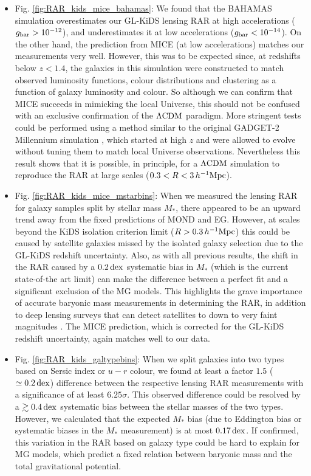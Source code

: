 \documentclass[usenatbib]{mnras}
\newcommand{\hMpc}{\, h^{-1}{\rm{Mpc}} }
\newcommand{\lcdm}{{\rm \Lambda CDM}}
\newcommand{\un}[1]{_{\rm #1}}
\newcommand{\dex}{\, {\rm dex}}
\begin{document}
\begin{itemize}
	\item Fig. \ref{fig:RAR_kids_mice_bahamas}: We found that the BAHAMAS simulation overestimates our GL-KiDS lensing RAR at high accelerations ($g\un{bar}>10^{-12}$), and underestimates it at low accelerations ($g\un{bar}<10^{-14}$). On the other hand, the prediction from MICE (at low accelerations) matches our measurements very well. However, this was to be expected since, at redshifts below $z<1.4$, the galaxies in this simulation were constructed to match observed luminosity functions, colour distributions and clustering as a function of galaxy luminosity and colour. So although we can confirm that MICE succeeds in mimicking the local Universe, this should not be confused with an exclusive confirmation of the $\lcdm$ paradigm. More stringent tests could be performed using a method similar to the original {\scshape GADGET-2} Millennium simulation \cite[]{springel2001,springel2005}, which started at high $z$ and were allowed to evolve without tuning them to match local Universe observations. Nevertheless this result shows that it is possible, in principle, for a $\lcdm$ simulation to reproduce the RAR at large scales ($0.3 < R < 3 \hMpc$).
	
	\item Fig. \ref{fig:RAR_kids_mice_mstarbins}: When we measured the lensing RAR for galaxy samples split by stellar mass $M_*$, there appeared to be an upward trend away from the fixed predictions of MOND and EG. However, at scales beyond the KiDS isolation criterion limit ($R>0.3 \hMpc$) this could be caused by satellite galaxies missed by the isolated galaxy selection due to the GL-KiDS redshift uncertainty. Also, as with all previous results, the shift in the RAR caused by a $0.2 \dex$ systematic bias in $M_*$ (which is the current state-of-the art limit) can make the difference between a perfect fit and a significant exclusion of the MG models. This highlights the grave importance of accurate baryonic mass measurements in determining the RAR, in addition to deep lensing surveys that can detect satellites to down to very faint magnitudes \cite[such as the future Euclid survey;][]{laureijs2011}. The MICE prediction, which is corrected for the GL-KiDS redshift uncertainty, again matches well to our data.
	
	\item Fig. \ref{fig:RAR_kids_galtypebins}: When we split galaxies into two types based on Sersic index or $u-r$ colour, we found at least a factor $1.5$ ($\simeq0.2 \dex$) difference between the respective lensing RAR measurements with a significance of at least $6.25 \sigma$. This observed difference could be resolved by a $\gtrsim 0.4 \dex$ systematic bias between the stellar masses of the two types. However, we calculated that the expected $M_*$ bias (due to Eddington bias or systematic biases in the $M_*$ measurement) is at most $0.17 \dex$. If confirmed, this variation in the RAR based on galaxy type could be hard to explain for MG models, which predict a fixed relation between baryonic mass and the total gravitational potential.
	

\end{itemize}
\end{document}
